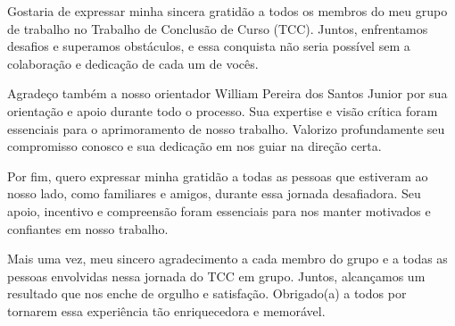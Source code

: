\begin{agradecimentos}
	Gostaria de expressar minha sincera gratidão a todos os membros do meu grupo de trabalho no Trabalho de Conclusão de Curso (TCC). Juntos, enfrentamos desafios e superamos obstáculos, e essa conquista não seria possível sem a colaboração e dedicação de cada um de vocês. 

	Agradeço também a nosso orientador William Pereira dos Santos Junior por sua orientação e apoio durante todo o processo. Sua expertise e visão crítica foram essenciais para o aprimoramento de nosso trabalho. Valorizo profundamente seu compromisso conosco e sua dedicação em nos guiar na direção certa.

	Por fim, quero expressar minha gratidão a todas as pessoas que estiveram ao nosso lado, como familiares e amigos, durante essa jornada desafiadora. Seu apoio, incentivo e compreensão foram essenciais para nos manter motivados e confiantes em nosso trabalho.

	Mais uma vez, meu sincero agradecimento a cada membro do grupo e a todas as pessoas envolvidas nessa jornada do TCC em grupo. Juntos, alcançamos um resultado que nos enche de orgulho e satisfação. Obrigado(a) a todos por tornarem essa experiência tão enriquecedora e memorável.
	
\end{agradecimentos}



